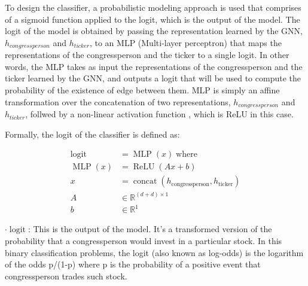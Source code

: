 \documentclass[15pt,letterpaper]{article}
\begin{document}
To design the classifier, a probabilistic modeling approach is used that comprises of a sigmoid function applied to the logit, which is the output of the model. The logit of the model is obtained by passing the representation learned by the GNN, $h_{congressperson}$ and $h_{ticker}$, to an MLP (Multi-layer perceptron) \citep{Gardner1998ArtificialNN, 7103337} that maps the representations of the congressperson and the ticker to a single logit. In other words, the MLP takes as input the representations of the congressperson and the ticker learned by the GNN, and outputs a logit that will be used to compute the probability of the existence of edge between them. MLP is simply an affine transformation over the concatenation of two representations, $h_{congressperson}$ and $h_{ticker}$, follwed by a non-linear activation function \citep{nonl}, which is ReLU \citep{relu} in this case.

Formally, the logit of the classifier is defined as:


\begin{align*}
  \operatorname{logit} &= \operatorname{MLP}\left(x\right) \operatorname{ where }\\  
  \operatorname{MLP}(x) &= \operatorname{ReLU}(Ax + b) \\
  x &= \operatorname{concat}\left(h_{\text{congressperson}}, h_{\text{ticker}}\right) \\
  A &\in \mathbb{R}^{(d+d) \times 1} \\
  b &\in \mathbb{R}^{1}
\end{align*}
  
  $\boldsymbol{\cdot}\operatorname{logit}$: This is the output of the model. It's a transformed version of the probability that a congressperson would invest in a particular stock. In this binary classification problems, the logit (also known as log-odds) is the logarithm of the odds p/(1-p) where p is the probability of a positive event that congressperson trades such stock.
  
\end{document}
